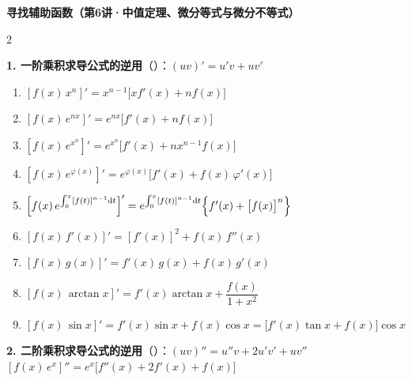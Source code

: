 \documentclass[a4paper,11pt]{article}
\begin{document}
    \pagestyle{empty}

    \begin{center}
        {\large\textbf{寻找辅助函数（第6讲·中值定理、微分等式与微分不等式）}}
    \end{center}

    \vspace{0.5em}

    \begin{multicols}{2}

\textbf{1. 一阶乘积求导公式的逆用}（{}）：$(uv)' = u'v + uv'$
        \begin{enumerate}[label=(\arabic*), leftmargin=2em, itemsep=0.55em]
            \item $[f(x)\,x^{n}]' = x^{n-1}\bigl[xf'(x) + nf(x)\bigr]$
            \item $[f(x)\,e^{nx}]' = e^{nx}\bigl[f'(x) + nf(x)\bigr]$
            \item $[f(x)\,e^{x^{n}}]' = e^{x^{n}}\bigl[f'(x) + nx^{n-1}f(x)\bigr]$
            \item $[f(x)\,e^{\varphi(x)}]' = e^{\varphi(x)}\bigl[f'(x) + f(x)\,\varphi'(x)\bigr]$
            \item $\Bigl[f(x)\,e^{\int_{0}^{x} [f(t)]^{n-1}\mathrm{d}t}\Bigr]' = e^{\int_{0}^{x} [f(t)]^{n-1}\mathrm{d}t}\Bigl\{f'(x) + \bigl[f(x)\bigr]^{n}\Bigr\}$
            \item $[f(x)\,f'(x)]' = [f'(x)]^{2} + f(x)\,f''(x)$
            \item $[f(x)\,g(x)]' = f'(x)\,g(x) + f(x)\,g'(x)$
            \item $[f(x)\,\arctan x]' = f'(x)\arctan x + \dfrac{f(x)}{1 + x^{2}}$
            \item $[f(x)\,\sin x]' = f'(x)\sin x + f(x)\cos x = \bigl[f'(x)\tan x + f(x)\bigr]\cos x$
        \end{enumerate}
\vspace{0.6em}

\textbf{2. 二阶乘积求导公式的逆用}（{\color{red}{凹凸性}}）：$(uv)'' = u''v + 2u'v' + uv''$
        \\$[f(x)\,e^{x}]'' = e^{x}\bigl[f''(x) + 2f'(x) + f(x)\bigr]$

        \vspace{0.6em}


\end{multicols}
\end{document}
